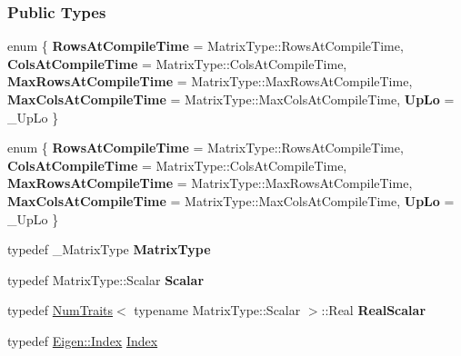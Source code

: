 \subsubsection*{Public Types}
\begin{DoxyCompactItemize}
\item 
\mbox{\label{group___cholesky___module_aa235185ac8ad7b857f1101342c771423}} 
enum \{ \newline
{\bfseries Rows\+At\+Compile\+Time} = Matrix\+Type\+:\+:Rows\+At\+Compile\+Time, 
{\bfseries Cols\+At\+Compile\+Time} = Matrix\+Type\+:\+:Cols\+At\+Compile\+Time, 
{\bfseries Max\+Rows\+At\+Compile\+Time} = Matrix\+Type\+:\+:Max\+Rows\+At\+Compile\+Time, 
{\bfseries Max\+Cols\+At\+Compile\+Time} = Matrix\+Type\+:\+:Max\+Cols\+At\+Compile\+Time, 
\newline
{\bfseries Up\+Lo} = \+\_\+\+Up\+Lo
 \}
\item 
\mbox{\label{group___cholesky___module_afe31fad531755b2da5cf261239cc93f3}} 
enum \{ \newline
{\bfseries Rows\+At\+Compile\+Time} = Matrix\+Type\+:\+:Rows\+At\+Compile\+Time, 
{\bfseries Cols\+At\+Compile\+Time} = Matrix\+Type\+:\+:Cols\+At\+Compile\+Time, 
{\bfseries Max\+Rows\+At\+Compile\+Time} = Matrix\+Type\+:\+:Max\+Rows\+At\+Compile\+Time, 
{\bfseries Max\+Cols\+At\+Compile\+Time} = Matrix\+Type\+:\+:Max\+Cols\+At\+Compile\+Time, 
\newline
{\bfseries Up\+Lo} = \+\_\+\+Up\+Lo
 \}
\item 
\mbox{\label{group___cholesky___module_a402092cb89eee4d7bc7502a9eac0d318}} 
typedef \+\_\+\+Matrix\+Type {\bfseries Matrix\+Type}
\item 
\mbox{\label{group___cholesky___module_a4e0935217cce5695a214c85e7ef813df}} 
typedef Matrix\+Type\+::\+Scalar {\bfseries Scalar}
\item 
\mbox{\label{group___cholesky___module_a2fe48d9c6549347a6b5156f2b2724416}} 
typedef \hyperlink{group___core___module_struct_eigen_1_1_num_traits}{Num\+Traits}$<$ typename Matrix\+Type\+::\+Scalar $>$\+::Real {\bfseries Real\+Scalar}
\item 
typedef \hyperlink{namespace_eigen_a62e77e0933482dafde8fe197d9a2cfde}{Eigen\+::\+Index} \hyperlink{group___cholesky___module_ad9c57eb2fb3bbccd51b9d2e111bea355}{Index}

\end{DoxyCompactItemize}

